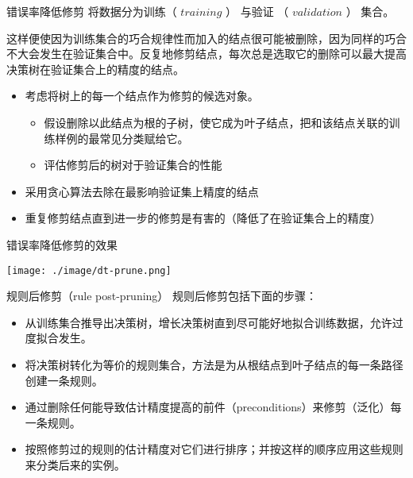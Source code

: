 \documentclass[presentation]{beamer}
\begin{document}
\begin{frame}[label={sec:org61db265}]{错误率降低修剪}
将数据分为训练（ \(training\) ） 与验证 （ \(validation\) ） 集合。

这样便使因为训练集合的巧合规律性而加入的结点很可能被删除，因为同样的巧合不大会发生在验证集合中。反复地修剪结点，每次总是选取它的删除可以最大提高决策树在验证集合上的精度的结点。


\begin{itemize}
\item 考虑将树上的每一个结点作为修剪的候选对象。
\begin{itemize}
\item 假设删除以此结点为根的子树，使它成为叶子结点，把和该结点关联的训练样例的最常见分类赋给它。
\item 评估修剪后的树对于验证集合的性能
\end{itemize}
\item 采用贪心算法去除在最影响验证集上精度的结点
\item 重复修剪结点直到进一步的修剪是有害的（降低了在验证集合上的精度）
\end{itemize}
\end{frame}

\begin{frame}[label={sec:org216ae6e}]{错误率降低修剪的效果}
\begin{center}
\texttt{[image: ./image/dt-prune.png]}
\end{center}
\end{frame}

\begin{frame}[label={sec:org29087c7}]{规则后修剪（rule post-pruning）}
规则后修剪包括下面的步骤：
\begin{itemize}
\item 从训练集合推导出决策树，增长决策树直到尽可能好地拟合训练数据，允许过度拟合发生。
\item 将决策树转化为等价的规则集合，方法是为从根结点到叶子结点的每一条路径创建一条规则。
\item 通过删除任何能导致估计精度提高的前件（preconditions）来修剪（泛化）每一条规则。
\item 按照修剪过的规则的估计精度对它们进行排序；并按这样的顺序应用这些规则来分类后来的实例。
\end{itemize}
\end{frame}
\end{document}
